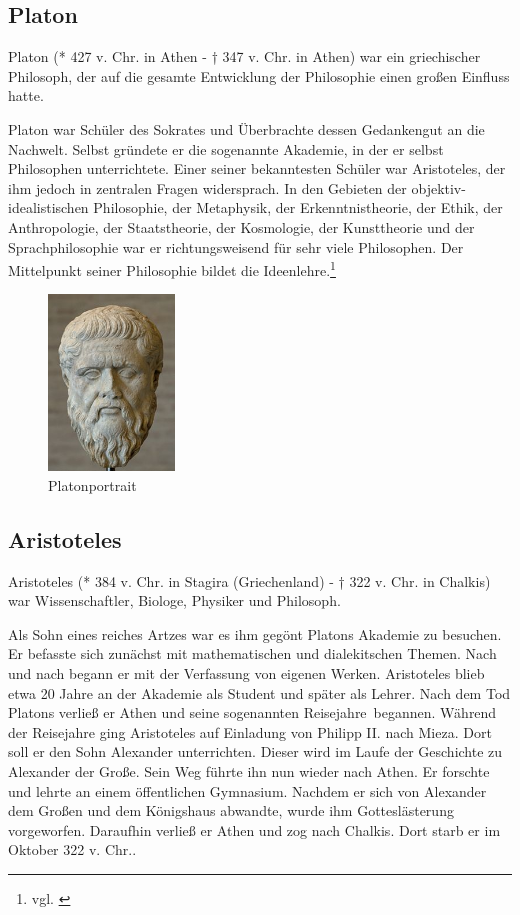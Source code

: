 \subsection{Platon}
Platon (* 427 v.  Chr. in Athen - † 347 v. Chr. in Athen) war ein griechischer Philosoph, der auf die gesamte Entwicklung der Philosophie einen großen Einfluss hatte. 

Platon war Schüler des Sokrates und Überbrachte dessen Gedankengut an die Nachwelt. Selbst gründete er die sogenannte Akademie, in der er selbst Philosophen unterrichtete. Einer seiner bekanntesten Schüler war Aristoteles, der ihm jedoch in zentralen Fragen widersprach.  In den Gebieten der objektiv-idealistischen Philosophie, der Metaphysik, der Erkenntnistheorie, der Ethik, der Anthropologie, der Staatstheorie, der Kosmologie, der Kunsttheorie und der Sprachphilosophie war er richtungsweisend für sehr viele Philosophen. Der Mittelpunkt seiner Philosophie bildet die Ideenlehre.\footnote{vgl. \cite{Platon1}}

\begin{figure}[H]
	\centering 
	\includegraphics[width=0.3\textwidth]{Bilder/kap3/platon} 
	\caption{Platonportrait  \label{portraitPlaton}}
\end{figure}

\subsection{Aristoteles}
Aristoteles (* 384 v. Chr. in Stagira (Griechenland) - † 322 v. Chr. in Chalkis) war Wissenschaftler, Biologe, Physiker und Philosoph. 

Als Sohn eines reiches Artzes war es ihm gegönt Platons Akademie zu besuchen. Er befasste sich zunächst mit mathematischen und dialekitschen Themen. Nach und nach begann er mit der Verfassung von eigenen Werken. Aristoteles blieb etwa 20 Jahre an der Akademie als Student und später als Lehrer. Nach dem Tod Platons verließ er Athen und seine sogenannten \glqq Reisejahre\grqq\ begannen. Während der Reisejahre ging Aristoteles auf Einladung von Philipp II. nach Mieza. Dort soll er den Sohn Alexander unterrichten. Dieser wird im Laufe der Geschichte zu Alexander der Große. Sein Weg führte ihn nun wieder nach Athen. Er forschte und lehrte an einem öffentlichen Gymnasium. Nachdem er sich von Alexander dem Großen und dem Königshaus abwandte, wurde ihm Gotteslästerung vorgeworfen. Daraufhin verließ er Athen und zog nach Chalkis. Dort starb er im Oktober 322 v. Chr.. 

